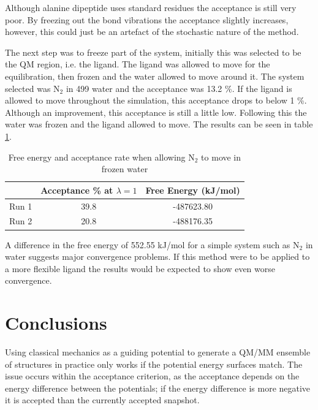 Although alanine dipeptide uses standard residues the acceptance is still very poor.  By freezing out the bond vibrations the acceptance slightly increases, however, this could just be an artefact of the stochastic nature of the method.

The next step was to freeze part of the system, initially this was selected to be the QM region, i.e. the ligand.  The ligand was allowed to move for the equilibration, then frozen and the water allowed to move around it.  The system selected was N$_2$ in 499 water and the acceptance was 13.2 \%.  If the ligand is allowed to move throughout the simulation, this acceptance drops to below 1 \%.  Although an improvement, this acceptance is still a little low.  Following this the water was frozen and the ligand allowed to move.  The results can be seen in table \ref{table:N2_frozen_water}.

\begin{center}
\begin{table}[ht]
{
\hfill{}
\begin{tabular}{ c | c | c}
\hline 
 & Acceptance \% at $\lambda =1$ & Free Energy (kJ/mol)  \\  
\hline 
Run 1 & 39.8 & -487623.80 \\ 
\hline
Run 2 & 20.8 & -488176.35 \\ 
\hline 
\end{tabular}}
\hfill{}
\caption{Free energy and acceptance rate when allowing N$_2$ to move in frozen water}
\label{table:N2_frozen_water}
\end{table}
\end{center}

A difference in the free energy of 552.55 kJ/mol for a simple system such as N$_2$ in water suggests major convergence problems.  If this method were to be applied to a more flexible ligand the results would be expected to show even worse convergence.



\section{Conclusions}

Using classical mechanics as a guiding potential to generate a QM/MM ensemble of structures in practice only works if the potential energy surfaces match.  The issue occurs within the acceptance criterion, as the acceptance depends on the energy difference between the potentials; if the energy difference is more negative it is accepted than the currently accepted snapshot.

